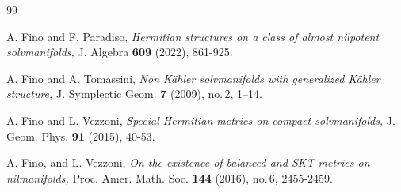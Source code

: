 \documentclass{amsart}
\begin{document}
\begin{thebibliography}{99}






 A. Fino and F. Paradiso, \emph{Hermitian structures on a class of almost nilpotent solvmanifolds,} J. Algebra {\bf 609} (2022), 861-925.









 A. Fino and A. Tomassini, \emph{Non K\"ahler solvmanifolds with generalized K\"ahler structure,} J. Symplectic Geom. {\bf 7} (2009), no.\,2, 1–14.






  A. Fino and L. Vezzoni, \emph{Special Hermitian metrics on compact solvmanifolds,} J. Geom. Phys. {\bf 91} (2015),
40-53.


  A. Fino, and L. Vezzoni, \emph{On the existence of balanced and SKT metrics on nilmanifolds,} Proc. Amer. Math. Soc. {\bf 144} (2016), no.\,6, 2455-2459.



\end{thebibliography}
\end{document}
